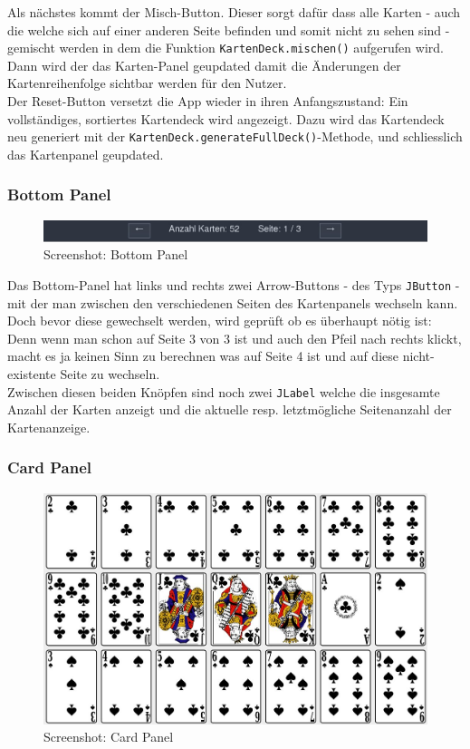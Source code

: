 \documentclass[a4paper,11pt]{article}
\begin{document}
Als nächstes kommt der Misch-Button. Dieser sorgt dafür dass alle Karten - auch die welche sich auf einer anderen Seite befinden und somit nicht zu sehen sind - gemischt werden in dem die Funktion \texttt{KartenDeck.mischen()} aufgerufen wird. Dann wird der das Karten-Panel geupdated damit die Änderungen der Kartenreihenfolge sichtbar werden für den Nutzer.\\

Der Reset-Button versetzt die App wieder in ihren Anfangszustand: Ein vollständiges, sortiertes Kartendeck wird angezeigt. Dazu wird das Kartendeck neu generiert mit der \texttt{KartenDeck.generateFullDeck()}-Methode, und schliesslich das Kartenpanel geupdated.

\subsubsection{Bottom Panel}
\begin{figure}[H]
    \centering
    \includegraphics[width=.9\textwidth]{media/bottom-panel.jpg}
    \caption{Screenshot: Bottom Panel}
\end{figure}

Das Bottom-Panel hat links und rechts zwei Arrow-Buttons - des Typs \texttt{JButton} - mit der man zwischen den verschiedenen Seiten des Kartenpanels wechseln kann. Doch bevor diese gewechselt werden, wird geprüft ob es überhaupt nötig ist: Denn wenn man schon auf Seite 3 von 3 ist und auch den Pfeil nach rechts klickt, macht es ja keinen Sinn zu berechnen was auf Seite 4 ist und auf diese nicht-existente Seite zu wechseln.\\

Zwischen diesen beiden Knöpfen sind noch zwei \texttt{JLabel} welche die insgesamte Anzahl der Karten anzeigt und die aktuelle resp. letztmögliche Seitenanzahl der Kartenanzeige.

\subsubsection{Card Panel}
\begin{figure}[H]
    \centering
    \includegraphics[width=.9\textwidth]{media/card-panel.jpg}
    \caption{Screenshot: Card Panel}
\end{figure}
\end{document}
